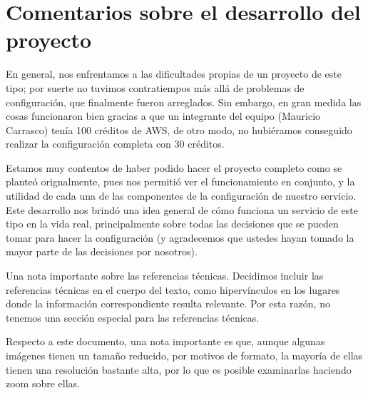 \documentclass{article}
\begin{document}
\section{Comentarios sobre el desarrollo del proyecto}

En general, nos enfrentamos a las dificultades propias
de un proyecto de este tipo; por suerte no tuvimos
contratiempos m\'as all\'a de problemas de configuraci\'on,
que finalmente fueron arreglados.   Sin embargo, en gran
medida las cosas funcionaron bien gracias a que un
integrante del equipo (Mauricio Carrasco) ten\'ia 100
cr\'editos de AWS, de otro modo, no hubi\'eramos conseguido
realizar la configuraci\'on completa con 30 cr\'editos.

Estamos muy contentos de haber podido hacer el proyecto
completo como se plante\'o orignalmente, pues nos permiti\'o
ver el funcionamiento en conjunto, y la utilidad de cada
una de las componentes de la configuraci\'on de nuestro
servicio.   Este desarrollo nos brind\'o una idea general
de c\'omo funciona un servicio de este tipo en la vida
real, principalmente sobre todas las decisiones que se
pueden tomar para hacer la configuraci\'on (y agradecemos
que ustedes hayan tomado la mayor parte de las decisiones
por nosotros).

Una nota importante sobre las referencias t\'ecnicas.
Decidimos incluir las referencias t\'ecnicas en el cuerpo
del texto, como hiperv\'inculos en los lugares donde la
informaci\'on correspondiente resulta relevante.   Por
esta raz\'on, no tenemos una secci\'on especial para
las referencias t\'ecnicas.

Respecto a este documento, una nota importante es que,
aunque algunas im\'agenes tienen un tama\~no reducido,
por motivos de formato, la mayor\'ia de ellas tienen
una resoluci\'on bastante alta, por lo que es posible
examinarlas haciendo zoom sobre ellas.
\end{document}
